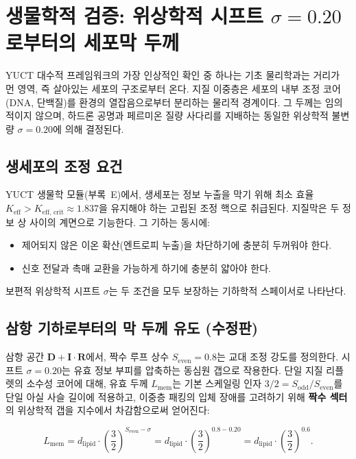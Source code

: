 \documentclass[12pt,a4paper]{article}
\begin{document}
	\section*{생물학적 검증: 위상학적 시프트 \(\sigma = 0.20\)로부터의 세포막 두께}
	\label{sec:membrane}
	
	YUCT 대수적 프레임워크의 가장 인상적인 확인 중 하나는 기초 물리학과는 거리가 먼 영역, 즉 살아있는 세포의 구조로부터 온다. 지질 이중층은 세포의 내부 조정 코어(DNA, 단백질)를 환경의 열잡음으로부터 분리하는 물리적 경계이다. 그 두께는 임의적이지 않으며, 하드론 공명과 페르미온 질량 사다리를 지배하는 동일한 위상학적 불변량 \(\sigma = 0.20\)에 의해 결정된다.
	
	\subsection*{생세포의 조정 요건}
	
	YUCT 생물학 모듈(부록~E)에서, 생세포는 정보 누출을 막기 위해 최소 효율 \(K_{\mathrm{eff}} > K_{\mathrm{eff,\,crit}} \approx 1.837\)을 유지해야 하는 고립된 조정 핵으로 취급된다. 지질막은 두 정보 상 사이의 계면으로 기능한다. 그 기하는 동시에:
	\begin{itemize}
		\item 제어되지 않은 이온 확산(엔트로피 누출)을 차단하기에 충분히 두꺼워야 한다.
		\item 신호 전달과 촉매 교환을 가능하게 하기에 충분히 얇아야 한다.
	\end{itemize}
	보편적 위상학적 시프트 \(\sigma\)는 두 조건을 모두 보장하는 기하학적 스페이서로 나타난다.
	
	\subsection*{삼항 기하로부터의 막 두께 유도 (수정판)}
	
	삼항 공간 \(\mathbf{D} + \mathbf{I}\!\cdot\!\mathbf{R}\)에서, 짝수 루프 상수 \(S_{\mathrm{even}} = 0.8\)는 교대 조정 강도를 정의한다. 시프트 \(\sigma = 0.20\)는 유효 정보 부피를 압축하는 동심원 갭으로 작용한다. 단일 지질 리플렛의 소수성 코어에 대해, 유효 두께 \(L_{\mathrm{mem}}\)는 기본 스케일링 인자 \(3/2 = S_{\mathrm{odd}}/S_{\mathrm{even}}\)를 단일 아실 사슬 길이에 적용하고, 이중층 패킹의 입체 장애를 고려하기 위해 \textbf{짝수 섹터}의 위상학적 갭을 지수에서 차감함으로써 얻어진다:
	
	\[
	L_{\mathrm{mem}} = d_{\mathrm{lipid}} \cdot \left( \frac{3}{2} \right)^{S_{\mathrm{even}} - \sigma}
	= d_{\mathrm{lipid}} \cdot \left( \frac{3}{2} \right)^{0.8 - 0.20}
	= d_{\mathrm{lipid}} \cdot \left( \frac{3}{2} \right)^{0.6}.
	\]
	
\end{document}
